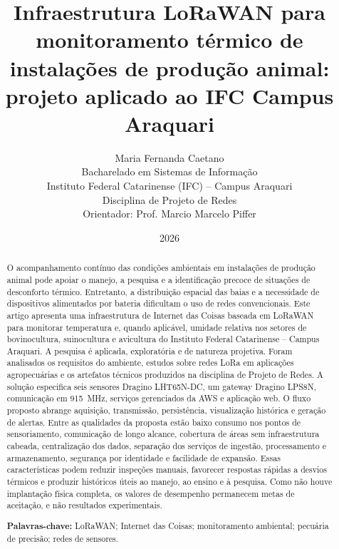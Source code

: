 \documentclass[10pt,a4paper,twocolumn]{article}
\title{\textbf{Infraestrutura LoRaWAN para monitoramento térmico de instalações de produção animal: projeto aplicado ao IFC Campus Araquari}}
\author{
  Maria Fernanda Caetano\\
  \small Bacharelado em Sistemas de Informação\\
  \small Instituto Federal Catarinense (IFC) -- Campus Araquari\\
  \small Disciplina de Projeto de Redes\\
  \small Orientador: Prof. Marcio Marcelo Piffer
}
\date{2026}
\newcommand{\keywords}[1]{\noindent\textbf{Palavras-chave:} #1}
\begin{document}
\maketitle

\begin{abstract}
\noindent
O acompanhamento contínuo das condições ambientais em instalações de produção
animal pode apoiar o manejo, a pesquisa e a identificação precoce de situações de
desconforto térmico. Entretanto, a distribuição espacial das baias e a necessidade
de dispositivos alimentados por bateria dificultam o uso de redes convencionais.
Este artigo apresenta uma infraestrutura de Internet das Coisas
baseada em LoRaWAN para monitorar temperatura e, quando aplicável, umidade
relativa nos setores de bovinocultura, suinocultura e avicultura do Instituto
Federal Catarinense -- Campus Araquari. A pesquisa é aplicada, exploratória e de
natureza projetiva. Foram analisados os requisitos do ambiente, estudos sobre
redes LoRa em aplicações agropecuárias e os artefatos técnicos produzidos na
disciplina de Projeto de Redes. A solução especifica seis sensores Dragino
LHT65N-DC, um gateway Dragino LPS8N, comunicação em \SI{915}{\mega\hertz},
serviços gerenciados da AWS e aplicação web. O
fluxo proposto abrange aquisição, transmissão, persistência, visualização
histórica e geração de alertas. Entre as qualidades da proposta estão baixo
consumo nos pontos de sensoriamento, comunicação de longo alcance, cobertura de
áreas sem infraestrutura cabeada, centralização dos dados, separação dos
serviços de ingestão, processamento e armazenamento, segurança por identidade e
facilidade de expansão. Essas características podem reduzir inspeções manuais,
favorecer respostas rápidas a desvios térmicos e produzir históricos úteis ao
 manejo, ao ensino e à pesquisa. Como não houve implantação física completa, os valores de
desempenho permanecem metas de aceitação, e não resultados experimentais.

\medskip
\keywords{LoRaWAN; Internet das Coisas; monitoramento ambiental; pecuária de precisão; redes de sensores.}
\end{abstract}
\end{document}

